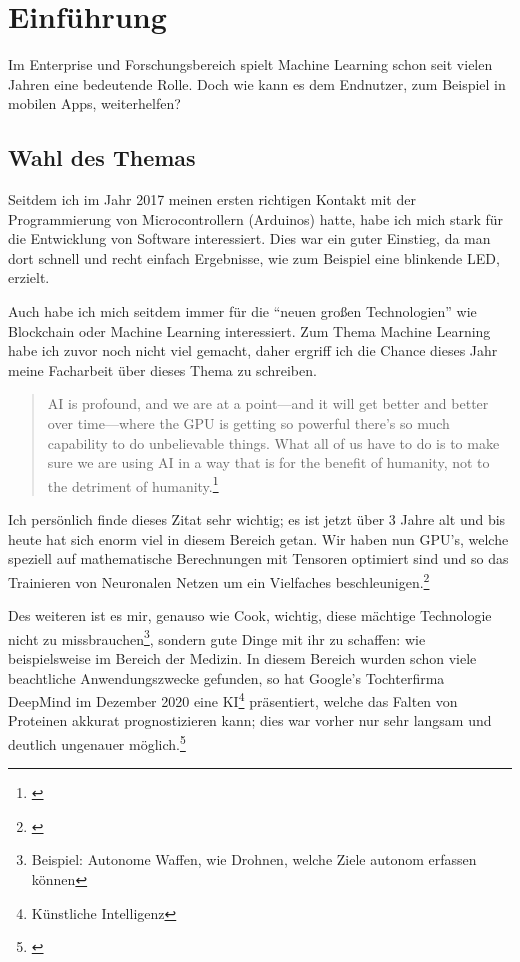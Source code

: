 \section{Einführung}
Im Enterprise und Forschungsbereich spielt Machine Learning schon seit vielen Jahren eine bedeutende Rolle. Doch wie kann es dem Endnutzer, zum Beispiel in mobilen Apps, weiterhelfen?

\subsection{Wahl des Themas}

Seitdem ich im Jahr 2017 meinen ersten richtigen Kontakt mit der Programmierung von Microcontrollern (Arduinos) hatte, habe ich mich stark für die Entwicklung von Software interessiert. Dies war ein guter Einstieg, da man dort schnell und recht einfach Ergebnisse, wie zum Beispiel eine blinkende LED, erzielt.

Auch habe ich mich seitdem immer für die "`neuen großen Technologien"' wie Blockchain oder Machine Learning interessiert. Zum Thema Machine Learning habe ich zuvor noch nicht viel gemacht, daher ergriff ich die Chance dieses Jahr meine Facharbeit über dieses Thema zu schreiben.


\begin{quotation}
    AI is profound, and we are at a point—and it will get better and better over time—where the GPU is getting so powerful there’s so much capability to do unbelievable things. What all of us have to do is to make sure we are using AI in a way that is for the benefit of humanity, not to the detriment of humanity.\footnote[1]{\cite[Tim Cook (CEO von Apple) In einem Interview mit MIT Technology Review]{timcookquote}}
\end{quotation}

Ich persönlich finde dieses Zitat sehr wichtig; es ist jetzt über 3 Jahre alt und bis heute hat sich enorm viel in diesem Bereich getan. Wir haben nun GPU's, welche speziell auf mathematische Berechnungen mit Tensoren optimiert sind und so das Trainieren von Neuronalen Netzen um ein Vielfaches beschleunigen.\footnote[2]{\cite[NVIDIA Grafikprozessoren mit integrierten Tensor Kernen]{nvidiatensorcores}}

Des weiteren ist es mir, genauso wie Cook, wichtig, diese mächtige Technologie nicht zu missbrauchen\footnote[3]{Beispiel: Autonome Waffen, wie Drohnen, welche Ziele autonom erfassen können}, sondern gute Dinge mit ihr zu schaffen: wie beispielsweise im Bereich der Medizin. In diesem Bereich wurden schon viele beachtliche Anwendungszwecke gefunden, so hat Google's Tochterfirma DeepMind im Dezember 2020 eine KI\footnote[4]{Künstliche Intelligenz} präsentiert, welche das Falten von Proteinen akkurat prognostizieren kann; dies war vorher nur sehr langsam und deutlich ungenauer möglich.\footnote[5]{\cite{deepmindprotein}}

